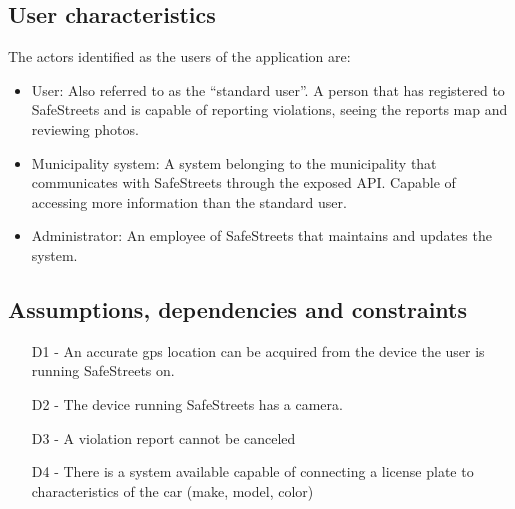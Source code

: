 \subsection{User characteristics}
The actors identified as the users of the application are:
\begin{itemize}
\item
User: Also referred to as the “standard user”. A person that has registered to SafeStreets and is capable of reporting violations, seeing the reports map and reviewing photos. 
\item
Municipality system: A system belonging to the municipality that communicates with SafeStreets through the exposed API. Capable of accessing more information than the standard user.
\item
Administrator: An employee of SafeStreets that maintains and updates the system.
\end{itemize}

\subsection{Assumptions, dependencies and constraints}

\begin{itemize}
\item
[D1] - An accurate gps location can be acquired from the device the user is running SafeStreets on.
\item
[D2] - The device running SafeStreets has a camera.
\item
[D3] - A violation report cannot be canceled
\item
[D4] - There is a system available capable of connecting a license plate to characteristics of the car (make, model, color)
\end{itemize}




